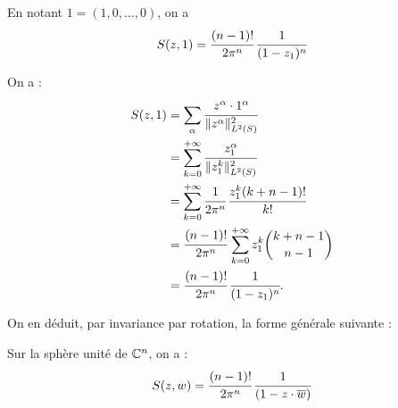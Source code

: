 \begin{lem}
	En notant $1=(1,0,\ldots, 0)$, on a 
	\begin{equation*}
		S(z,1)=\cfrac{(n-1)!}{2\pi^n}\,\cfrac{1}{(1-z_1)^n}
	\end{equation*}
\end{lem}
\begin{preuve}
	On a :
	\begin{align*}
		S(z,1)&=\sum_{\alpha}\cfrac{z^{\alpha}\cdot 1^{\alpha}}{\|z^{\alpha}\|^2_{L^2(S)}}\\
		&=\sum_{k=0}^{+\infty}\cfrac{z_1^{\alpha}}{\|z_1^{k}\|^2_{L^2(S)}}\\
		&=\sum_{k=0}^{+\infty}\cfrac{1}{2\pi^n}\,\cfrac{z_1^k(k+n-1)!}{k!}\\
		&=\cfrac{(n-1)!}{2\pi^n}\,\sum_{k=0}^{+\infty}{z_1^k}\binom{k+n-1}{n-1}\\
		&=\cfrac{(n-1)!}{2\pi^n}\,\cfrac{1}{(1-z_1)^n}.
	\end{align*}
\end{preuve}

On en déduit, par invariance par rotation, la forme générale suivante :

\begin{prop}
	Sur la sphère unité de $\mathbb{C}^n$, on a :
		\begin{equation*}
			S(z,w) = \cfrac{(n-1)!}{2\pi^n}\,\cfrac{1}{(1-z\cdot \overline{w})}
		\end{equation*}
\end{prop}
